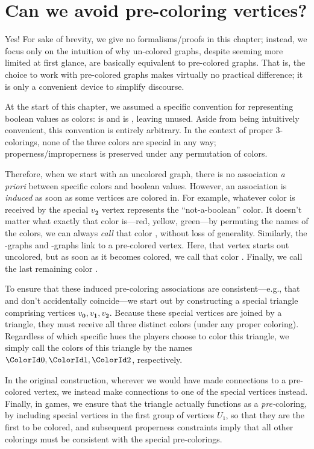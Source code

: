 \section{Can we avoid pre-coloring vertices?}

\label{sec:precolor}

Yes!  For sake of brevity, we give no formalisms/proofs in this chapter;
instead, we focus only on the intuition of why un-colored graphs, despite
seeming more limited at first glance, are basically equivalent to pre-colored
graphs.  That is, the choice to work with pre-colored graphs makes virtually no
practical difference; it is only a convenient device to simplify discourse.

At the start of this chapter, we assumed a specific convention for representing
boolean values as colors: \True{} is  and \False{} is ,
leaving  unused.  Aside from being intuitively convenient, this
convention is entirely arbitrary.  In the context of proper 3-colorings, none of
the three colors are special in any way; properness/improperness is preserved
under any permutation of colors.

Therefore, when we start with an uncolored graph, there is no association
\emph{a priori} between specific colors and boolean values.  However, an
association is \emph{induced} as soon as some vertices are colored in.  For
example, whatever color is received by the special \(v_{\mathbf 2}\) vertex
represents the ``not-a-boolean'' color.  It doesn't matter what exactly that
color is—red, yellow, green—by permuting the names of the colors, we can always
\emph{call} that color , without loss of generality.  Similarly, the
\AND-graphs and \OR-graphs link to a pre-colored  vertex.  Here, that
vertex starts out uncolored, but as soon as it becomes colored, we call that
color .  Finally, we call the last remaining color .

To ensure that these induced pre-coloring associations are consistent—e.g., that
 and  don't accidentally coincide—we start out by constructing
a special triangle comprising vertices
\(v_{\mathbf0},v_{\mathbf1},v_{\mathbf2}\).  Because these special vertices are
joined by a triangle, they must receive all three distinct colors (under any
proper coloring).  Regardless of which specific hues the players choose to color
this triangle, we simply call the colors of this triangle by the names
\(\ColorId0,\ColorId1,\ColorId2\), respectively.

In the original construction, wherever we would have made connections to a
pre-colored vertex, we instead make connections to one of the special vertices
instead.  Finally, in \Col[k] games, we ensure that the triangle actually
functions as a \emph{pre-}coloring, by including special vertices in the first
group of vertices \(U₁\), so that they are the first to be colored, and
subsequent properness constraints imply that all other colorings must be
consistent with the special pre-colorings.

%
%
%
%
